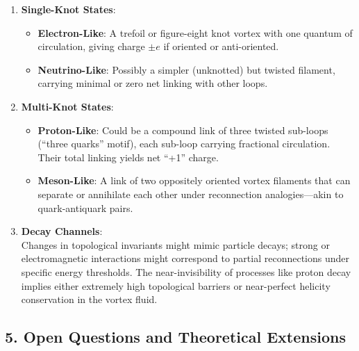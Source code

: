 \documentclass[aps,preprint,superscriptaddress]{revtex4-2}
\begin{document}
    \begin{enumerate}
        \item \textbf{Single-Knot States}:
        \begin{itemize}
            \item \textbf{Electron-Like}: A trefoil or figure-eight knot vortex with one quantum of circulation, giving charge \(\pm e\) if oriented or anti-oriented.
            \item \textbf{Neutrino-Like}: Possibly a simpler (unknotted) but twisted filament, carrying minimal or zero net linking with other loops.
        \end{itemize}
        \item \textbf{Multi-Knot States}:
        \begin{itemize}
            \item \textbf{Proton-Like}: Could be a compound link of three twisted sub-loops (“three quarks” motif), each sub-loop carrying fractional circulation. Their total linking yields net “+1” charge.
            \item \textbf{Meson-Like}: A link of two oppositely oriented vortex filaments that can separate or annihilate each other under reconnection analogies—akin to quark-antiquark pairs.
        \end{itemize}
        \item \textbf{Decay Channels}: \\
    Changes in topological invariants might mimic particle decays; strong or electromagnetic interactions might correspond to partial reconnections under specific energy thresholds. The near-invisibility of processes like proton decay implies either extremely high topological barriers or near-perfect helicity conservation in the vortex fluid.
    \end{enumerate}

    \subsection*{5. Open Questions and Theoretical Extensions}
\end{document}

